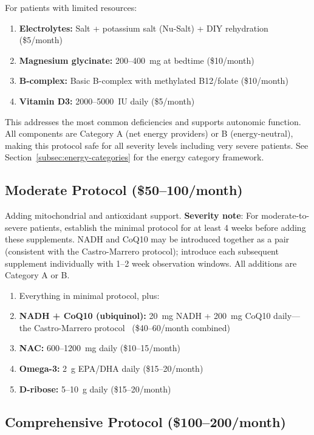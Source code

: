 For patients with limited resources:

\begin{enumerate}
    \item \textbf{Electrolytes:} Salt + potassium salt (Nu-Salt) + DIY rehydration (\$5/month)
    \item \textbf{Magnesium glycinate:} 200--400~mg at bedtime (\$10/month)
    \item \textbf{B-complex:} Basic B-complex with methylated B12/folate (\$10/month)
    \item \textbf{Vitamin D3:} 2000--5000~IU daily (\$5/month)
\end{enumerate}

This addresses the most common deficiencies and supports autonomic function. All components are Category A (net energy providers) or B (energy-neutral), making this protocol safe for all severity levels including very severe patients. See Section~\ref{subsec:energy-categories} for the energy category framework.

\subsection{Moderate Protocol (\$50--100/month)}

Adding mitochondrial and antioxidant support. \textbf{Severity note}: For moderate-to-severe patients, establish the minimal protocol for at least 4 weeks before adding these supplements. NADH and CoQ10 may be introduced together as a pair (consistent with the Castro-Marrero protocol); introduce each subsequent supplement individually with 1--2 week observation windows. All additions are Category A or B.

\begin{enumerate}
    \item Everything in minimal protocol, plus:
    \item \textbf{NADH + CoQ10 (ubiquinol):} 20~mg NADH + 200~mg CoQ10 daily---the Castro-Marrero protocol~\cite{CastroMarrero2021fatigue} (\$40--60/month combined)
    \item \textbf{NAC:} 600--1200~mg daily (\$10--15/month)
    \item \textbf{Omega-3:} 2~g EPA/DHA daily (\$15--20/month)
    \item \textbf{D-ribose:} 5--10~g daily (\$15--20/month)
\end{enumerate}

\subsection{Comprehensive Protocol (\$100--200/month)}

